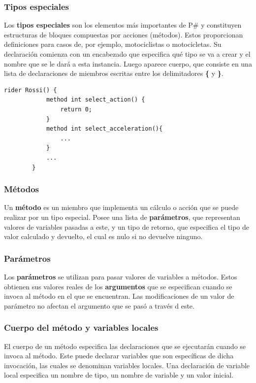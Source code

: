 \documentclass[12pt, letterpaper,spanish]{article}
\theoremstyle{definition}
\theoremstyle{remark}
\begin{document}
	\subsubsection{Tipos especiales}
	Los \textbf{tipos especiales} son los elementos más importantes de P\# y constituyen estructuras de bloques compuestas por acciones (métodos). Estos proporcionan definiciones para casos de, por ejemplo, motociclistas o motocicletas. Su declaración comienza con un encabezado que especifica qué tipo se va a crear y el nombre que se le dará a esta instancia. Luego aparece cuerpo, que consiste en una lista de declaraciones de miembros escritas entre los delimitadores \textbf{\{} y \textbf{\}}.
	
	\begin{lstlisting}[language={PySharp}]
		rider Rossi() {
			method int select_action() {    
				return 0;
			}
			method int select_acceleration(){
				...
			}
			...
		}
	\end{lstlisting}
	\subsubsection{Métodos}
	Un \textbf{método} es un miembro que implementa un cálculo o acción que se puede realizar por un tipo especial. Posee una lista de \textbf{parámetros}, que representan valores de variables pasadas a este, y un tipo de retorno, que especifica el tipo de valor calculado y devuelto, el cual es nulo si no devuelve ninguno.

	\subsubsection{Parámetros}
	Los \textbf{parámetros} se utilizan para pasar valores de variables a métodos. Estos obtienen sus valores reales de los \textbf{argumentos} que se especifican cuando se invoca al método en el que se encuentran. Las modificaciones de un valor de parámetro no afectan el argumento que se pasó a través d este.
	
	\subsubsection{Cuerpo del método y variables locales}
	El cuerpo de un método especifica las declaraciones que se ejecutarán cuando se invoca al método. Este puede declarar variables que son específicas de dicha invocación, las cuales se denominan variables locales. Una declaración de variable local especifica un nombre de tipo, un nombre de variable y un valor inicial.
	
\end{document}
